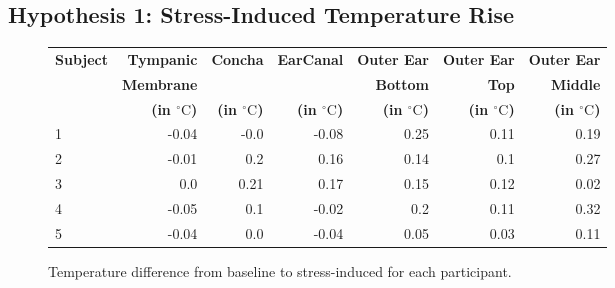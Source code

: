 \subsection{Hypothesis 1: Stress-Induced Temperature Rise}
\label{subsec:Evaluation:Study2:Hypothesis1}

\begin{figure}[t]
    \centering
    
    \begin{subtable}{\textwidth}
        \centering
        \begin{tabular}{|l|rrrrrr|}
        \hline
        \textbf{Subject} & \textbf{Tympanic} & \textbf{Concha} & \textbf{EarCanal} & \textbf{Outer Ear} & \textbf{Outer Ear} & \textbf{Outer Ear} \\
             & \textbf{Membrane} &  &  & \textbf{Bottom} & \textbf{Top} & \textbf{Middle} \\   
             &\textbf{(in \(^\circ\text{C}\))} & \textbf{(in \(^\circ\text{C}\))} & \textbf{(in \(^\circ\text{C}\))} & \textbf{(in \(^\circ\text{C}\))} & \textbf{(in \(^\circ\text{C}\))} & \textbf{(in \(^\circ\text{C}\))} \\
        \hline
        1 & -0.04 & -0.0 & -0.08 & 0.25 & 0.11 & 0.19 \\
        2 & -0.01 & 0.2 & 0.16 & 0.14 & 0.1 & 0.27 \\
        3 & 0.0 & 0.21 & 0.17 & 0.15 & 0.12 & 0.02 \\
        4 & -0.05 & 0.1 & -0.02 & 0.2 & 0.11 & 0.32 \\
        5 & -0.04 & 0.0 & -0.04 & 0.05 & 0.03 & 0.11 \\
        \hline
        \end{tabular}
        \caption{Temperature difference from baseline to stress-induced for each participant.}
        \label{subsec:Evaluation:Study2:Hypothesis1:temp_diff_sitting_to_stress_all}
    \end{subtable}
    
    \vspace{1em} %
    

\end{figure}
